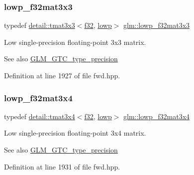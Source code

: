 \subsubsection{\texorpdfstring{lowp\+\_\+f32mat3x3}{lowp\_f32mat3x3}}
{\footnotesize\ttfamily typedef \hyperlink{structglm_1_1detail_1_1tmat3x3}{detail\+::tmat3x3}$<$\hyperlink{group__gtc__type__precision_ga0ec999b57f5330d9021256e96038df04}{f32}, \hyperlink{namespaceglm_a0f04f086094c747d227af4425893f545ae161af3fc695e696ce3bf69f7332bc2d}{lowp}$>$ \hyperlink{group__gtc__type__precision_ga92f4b130a9651c69361600272f113542}{glm\+::lowp\+\_\+f32mat3x3}}

Low single-\/precision floating-\/point 3x3 matrix. \begin{DoxySeeAlso}{See also}
\hyperlink{group__gtc__type__precision}{G\+L\+M\+\_\+\+G\+T\+C\+\_\+type\+\_\+precision} 
\end{DoxySeeAlso}


Definition at line 1927 of file fwd.\+hpp.

\mbox{\label{group__gtc__type__precision_ga7f81032f05c8a1b96b33c328f38c72d3}} 
\subsubsection{\texorpdfstring{lowp\+\_\+f32mat3x4}{lowp\_f32mat3x4}}
{\footnotesize\ttfamily typedef \hyperlink{structglm_1_1detail_1_1tmat3x4}{detail\+::tmat3x4}$<$\hyperlink{group__gtc__type__precision_ga0ec999b57f5330d9021256e96038df04}{f32}, \hyperlink{namespaceglm_a0f04f086094c747d227af4425893f545ae161af3fc695e696ce3bf69f7332bc2d}{lowp}$>$ \hyperlink{group__gtc__type__precision_ga7f81032f05c8a1b96b33c328f38c72d3}{glm\+::lowp\+\_\+f32mat3x4}}

Low single-\/precision floating-\/point 3x4 matrix. \begin{DoxySeeAlso}{See also}
\hyperlink{group__gtc__type__precision}{G\+L\+M\+\_\+\+G\+T\+C\+\_\+type\+\_\+precision} 
\end{DoxySeeAlso}


Definition at line 1931 of file fwd.\+hpp.

\mbox{\label{group__gtc__type__precision_gada4d11f44b410c1be7b6b1d05ccf692c}} 
